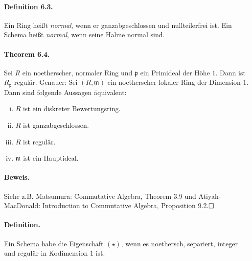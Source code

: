 \documentclass[11pt,b5paper,openany]{memoir}
\def \qed {$\hfill\square$}
\begin{document}
\paragraph{Definition 6.3.}\label{6.3}
Ein Ring heißt \textit{normal}, wenn er ganzabgeschlossen und nullteilerfrei ist.
Ein Schema heißt \textit{normal}, wenn seine Halme normal sind.

\paragraph{Theorem 6.4.}\label{6.4} Sei $R$ ein noetherscher, normaler Ring und $\mathfrak{p}$ ein Primideal der Hö\-he $1$. Dann ist $R_\mathfrak{p}$ regulär. Genauer: Sei $(R,\mathfrak{m})$ ein noetherscher lokaler Ring der Dimension $1$. Dann sind folgende Aussagen äquivalent:
\begin{enumerate}[(i)]
\item $R$ ist ein diskreter Bewertungsring.
\item $R$ ist ganzabgeschlossen.
\item $R$ ist regulär.
\item $\mathfrak{m}$ ist ein Hauptideal.
\end{enumerate}

\paragraph{Beweis.} Siehe z.B. Matsumura: \glqq Commutative Algebra\grqq, Theorem 3.9 und Ati\-yah-Mac\-Do\-nald: \glqq Introduction to Commutative Algebra\grqq, Proposition 9.2.\qed

\paragraph{Definition.} Ein Schema habe die Eigenschaft $(\star)$, wenn es noethersch, separiert, integer und regulär in Kodimension $1$ ist.
\end{document}
